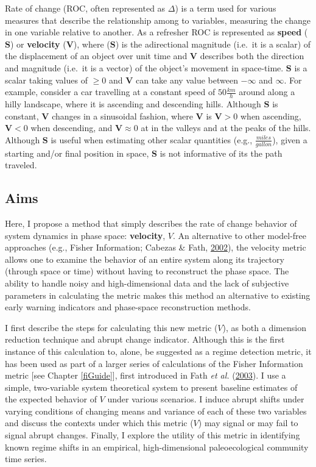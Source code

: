 \documentclass[print]{nuthesis}
\begin{document}
Rate of change (ROC, often represented as \(\Delta\)) is a term used for various measures that describe the relationship among to variables, measuring the change in one variable relative to another. As a refresher ROC is represented as \textbf{speed} (\(\textbf{S}\)) or \textbf{velocity} (\(\textbf{V}\)), where (\(\textbf{S}\)) is the adirectional magnitude (i.e.~it is a scalar) of the displacement of an object over unit time and \(\textbf{V}\) describes both the direction and magnitude (i.e.~it is a vector) of the object's movement in space-time. \(\textbf{S}\) is a scalar taking values of \(\geq0\) and \(\textbf{V}\) can take any value between \(-\infty\) and \(\infty\). For example, consider a car travelling at a constant speed of \(50\frac{km}{h}\) around along a hilly landscape, where it is ascending and descending hills. Although \(\textbf{S}\) is constant, \(\textbf{V}\) changes in a sinusoidal fashion, where \(\textbf{V}\) is \(\textbf{V}>0\) when ascending, \(\textbf{V}<0\) when descending, and \(\textbf{V}\approx0\) at in the valleys and at the peaks of the hills. Although \(\textbf{S}\) is useful when estimating other scalar quantities (e.g., \(\frac{miles}{gallon}\)), given a starting and/or final position in space, \(\textbf{S}\) is not informative of its the path traveled.

\hypertarget{aims-1}{%
\subsection{Aims}\label{aims-1}}

Here, I propose a method that simply describes the rate of change behavior of system dynamics in phase space: \textbf{velocity}, \(V\). An alternative to other model-free approaches (e.g., Fisher Information; Cabezas \& Fath, \protect\hyperlink{ref-cabezas_towards_2002}{2002}), the velocity metric allows one to examine the behavior of an entire system along its trajectory
(through space or time) without having to reconstruct the phase space. The ability to handle noisy and high-dimensional data and the lack of subjective parameters in calculating the metric makes this method an alternative to existing early warning indicators and phase-space reconstruction methods.

I first describe the steps for calculating this new metric (\(V\)), as both a dimension reduction technique and abrupt change indicator. Although this is the first instance of this calculation to, alone, be suggested as a regime detection metric, it has been used as part of a larger series of calculations of the Fisher Information metric {[}see Chapter \ref{fiGuide}{]}, first introduced in Fath \emph{et al.} (\protect\hyperlink{ref-fath_regime_2003}{2003}). I use a simple, two-variable system theoretical system to present baseline estimates of the expected behavior of \(V\) under various scenarios. I induce abrupt shifts under varying conditions of changing means and variance of each of these two variables and discuss the contexts under which this metric (\(V\)) may signal or may fail to signal abrupt changes. Finally, I explore the utility of this metric in identifying known regime shifts in an empirical, high-dimensional paleoecological community time series.
\end{document}
